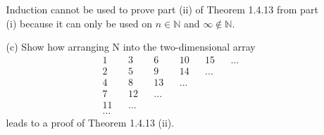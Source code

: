 \documentclass[12pt,letterpaper]{article}
\begin{document}
\begin{itemize}[leftmargin=!,labelindent=5pt]
\begin{itemize}
                Induction cannot be used to prove part (ii) of Theorem 1.4.13 from part (i) because it can only be used on $n \in \mathbb{N}$ and $\infty \notin \mathbb{N}$.
                \item [(c)] Show how arranging N into the two-dimensional array
                    \begin{align*}
                        &1 && 3 && 6 && 10 && 15 && ... \\
                        &2 && 5 && 9 && 14 && ... \\
                        &4 && 8 && 13 && ... \\
                        &7 && 12 && ... \\
                        &11 && ... \\
                        &...
                    \end{align*}
                    leads to a proof of Theorem 1.4.13 (ii).
                    

\end{itemize}
\end{itemize}
\end{document}
